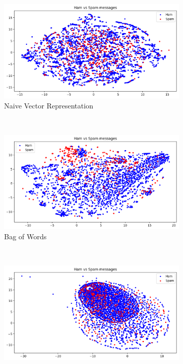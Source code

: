 \documentclass[letterpaper]{article}
\begin{document}
\begin{figure}[p]
	\centering
	\begin{subfigure}[t]{0.5\textwidth}
		\centering
		\includegraphics[width = 0.95 \linewidth]{./plot_representations/naive.png}
		\caption{Naive Vector Representation}
		\label{fig: naive}
	\end{subfigure}%
	~ 
	\begin{subfigure}[t]{0.5\textwidth}
		\centering
		\includegraphics[width = 0.95 \linewidth]{./plot_representations/bow.png}
		\caption{Bag of Words}
		\label{fig: bow}
	\end{subfigure}
	~
	\begin{subfigure}[t]{0.5\textwidth}
		\centering
		\includegraphics[width = 0.95 \linewidth]{./plot_representations/tfidf.png}

\end{subfigure}
\end{figure}
\end{document}

